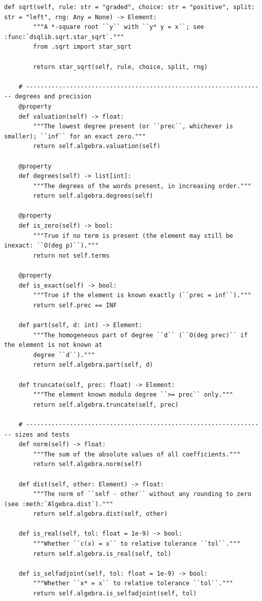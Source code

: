\documentclass[12pt, a4paper]{report}
\theoremstyle{plain}
\theoremstyle{definition}
\theoremstyle{remark}
\theoremstyle{plain}
\begin{document}
\begin{lstlisting}[style=dsqcode]
    def sqrt(self, rule: str = "graded", choice: str = "positive", split: str = "left", rng: Any = None) -> Element:
        """A *-square root ``y`` with ``y* y = x``; see :func:`dsqlib.sqrt.star_sqrt`."""
        from .sqrt import star_sqrt

        return star_sqrt(self, rule, choice, split, rng)

    # ------------------------------------------------------------------ degrees and precision
    @property
    def valuation(self) -> float:
        """The lowest degree present (or ``prec``, whichever is smaller); ``inf`` for an exact zero."""
        return self.algebra.valuation(self)

    @property
    def degrees(self) -> list[int]:
        """The degrees of the words present, in increasing order."""
        return self.algebra.degrees(self)

    @property
    def is_zero(self) -> bool:
        """True if no term is present (the element may still be inexact: ``O(deg p)``)."""
        return not self.terms

    @property
    def is_exact(self) -> bool:
        """True if the element is known exactly (``prec = inf``)."""
        return self.prec == INF

    def part(self, d: int) -> Element:
        """The homogeneous part of degree ``d`` (``O(deg prec)`` if the element is not known at
        degree ``d``)."""
        return self.algebra.part(self, d)

    def truncate(self, prec: float) -> Element:
        """The element known modulo degree ``>= prec`` only."""
        return self.algebra.truncate(self, prec)

    # ------------------------------------------------------------------ sizes and tests
    def norm(self) -> float:
        """The sum of the absolute values of all coefficients."""
        return self.algebra.norm(self)

    def dist(self, other: Element) -> float:
        """The norm of ``self - other`` without any rounding to zero (see :meth:`Algebra.dist`)."""
        return self.algebra.dist(self, other)

    def is_real(self, tol: float = 1e-9) -> bool:
        """Whether ``c(x) = x`` to relative tolerance ``tol``."""
        return self.algebra.is_real(self, tol)

    def is_selfadjoint(self, tol: float = 1e-9) -> bool:
        """Whether ``x* = x`` to relative tolerance ``tol``."""
        return self.algebra.is_selfadjoint(self, tol)


\end{lstlisting}
\end{document}
